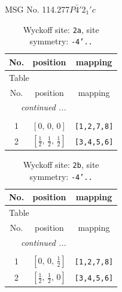 \documentclass[fleqn,8pt]{jsarticle}
\begin{document}
\setcounter{MaxMatrixCols}{32}

\renewcommand{\tablename}{Table~}
\renewcommand{\figurename}{Figure~}
\begin{center}
\LARGE
MSG No. 114.277\quad$P\bar{4}'2_{1}'c$
\end{center}
\renewcommand{\arraystretch}{1.2}
\begin{longtable}{ccc}
\caption{Wyckoff site: {\tt 2a}, site symmetry: {\tt -4'..}}
 \\
 \hline \hline
No. & position & mapping \\ \hline \endfirsthead

\multicolumn{2}{l}{\tablename\ \thetable{}} \\
 \hline \hline
No. & position & mapping \\ \hline \endhead

 \hline \hline
\multicolumn{2}{r}{\footnotesize\it continued ...} \\ \endfoot

 \hline \hline
\multicolumn{2}{r}{} \\ \endlastfoot

1 & $\left[ 0,\, 0,\, 0 \right]$ & {\tt [1,2,7,8]} \\ \hline
2 & $\left[ \frac{1}{2},\, \frac{1}{2},\, \frac{1}{2} \right]$ & {\tt [3,4,5,6]} \\
\end{longtable}
\renewcommand{\arraystretch}{1.2}
\begin{longtable}{ccc}
\caption{Wyckoff site: {\tt 2b}, site symmetry: {\tt -4'..}}
 \\
 \hline \hline
No. & position & mapping \\ \hline \endfirsthead

\multicolumn{2}{l}{\tablename\ \thetable{}} \\
 \hline \hline
No. & position & mapping \\ \hline \endhead

 \hline \hline
\multicolumn{2}{r}{\footnotesize\it continued ...} \\ \endfoot

 \hline \hline
\multicolumn{2}{r}{} \\ \endlastfoot

1 & $\left[ 0,\, 0,\, \frac{1}{2} \right]$ & {\tt [1,2,7,8]} \\ \hline
2 & $\left[ \frac{1}{2},\, \frac{1}{2},\, 0 \right]$ & {\tt [3,4,5,6]} \\
\end{longtable}
\end{document}
